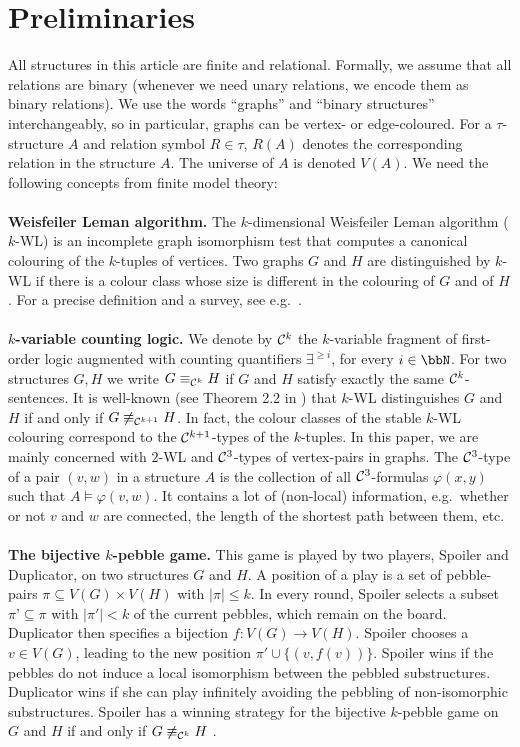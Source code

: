 \documentclass[10pt,a4paper]{article}
\renewcommand{\phi}{\varphi}
\newcommand{\lra}{\longrightarrow}
\renewcommand{\phi}{\varphi}
\newcommand{\Cc}{{\cal C}}
\begin{document}
	\section{Preliminaries}
	All structures in this article are finite and relational. Formally, we assume that all relations are binary (whenever we need unary relations, we encode them as binary relations). We use the words ``graphs'' and ``binary structures'' interchangeably, so in particular, graphs can be vertex- or edge-coloured.  
	For a $\tau$-structure $A$ and relation symbol $R \in \tau$, $R(A)$ denotes the corresponding relation in the structure $A$. The universe of $A$ is denoted $V(A)$. We need the following concepts from finite model theory:\\
	\\
	\textbf{Weisfeiler Leman algorithm.} The $k$-dimensional Weisfeiler Leman algorithm ($k$-WL) is an incomplete graph isomorphism test that computes a canonical colouring of the $k$-tuples of vertices. Two graphs $G$ and $H$ are distinguished by $k$-WL if there is a colour class whose size is different in the colouring of $G$ and of $H$. For a precise definition and a survey, see e.g.\  \cite{sandraSiglog}.\\
	\\
	\textbf{$k$-variable counting logic.} We denote by $\Cc^k$ the $k$-variable fragment of first-order logic augmented with counting quantifiers $\exists^{\geq i}$, for every $i \in \bbN$. For two structures $G,H$ we write $G \equiv_{\Cc^k} H$ if $G$ and $H$ satisfy exactly the same $\Cc^k$-sentences. It is well-known (see Theorem 2.2 in \cite{sandraSiglog}) that $k$-WL distinguishes $G$ and $H$ if and only if $G \not\equiv_{\Cc^{k+1}} H$. In fact, the colour classes of the stable $k$-WL colouring correspond to the $\Cc^{k+1}$-types of the $k$-tuples. In this paper, we are mainly concerned with $2$-WL and $\Cc^3$-types of vertex-pairs in graphs. The $\Cc^3$-type of a pair $(v,w)$ in a structure $A$ is the collection of all $\Cc^3$-formulas $\phi(x,y)$ such that $A \models \phi(v,w)$. It contains a lot of (non-local) information, e.g.\ whether or not $v$ and $w$ are connected, the length of the shortest path between them, etc.\\
	\\
	\textbf{The bijective $k$-pebble game.} This game is played by two players, Spoiler and Duplicator, on two structures $G$ and $H$. A position of a play is a set of pebble-pairs $\pi \subseteq V(G) \times V(H)$ with $|\pi| \leq k$. In every round, Spoiler selects a subset $\pi’ \subseteq \pi$ with $|\pi'| < k$ of the current pebbles, which remain on the board. Duplicator then specifies a bijection $f : V(G) \lra V(H)$. Spoiler chooses a $v \in V(G)$, leading to the new position $\pi' \cup \{(v,f(v))\}$. Spoiler wins if the pebbles do not induce a local isomorphism between the pebbled substructures. Duplicator wins if she can play infinitely avoiding the pebbling of non-isomorphic substructures. Spoiler has a winning strategy for the bijective $k$-pebble game on $G$ and $H$ if and only if $G \not\equiv_{\Cc^k} H$ \cite{hella1996logical}.\\
\end{document}
